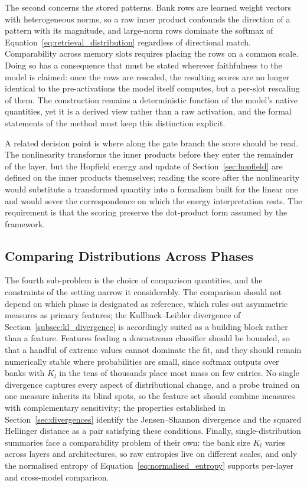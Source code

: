 The second concerns the stored patterns. Bank rows are learned weight
vectors with heterogeneous norms, so a raw inner product confounds the
direction of a pattern with its magnitude, and large-norm rows dominate the
softmax of Equation~\eqref{eq:retrieval_distribution} regardless of
directional match. Comparability across memory slots requires placing the
rows on a common scale. Doing so has a consequence that must be stated
wherever faithfulness to the model is claimed: once the rows are rescaled,
the resulting scores are no longer identical to the pre-activations the
model itself computes, but a per-slot rescaling of them. The construction
remains a deterministic function of the model's native quantities, yet it is
a derived view rather than a raw activation, and the formal statements of
the method must keep this distinction explicit.

A related decision point is where along the gate branch the score should be
read. The nonlinearity transforms the inner products before they enter the
remainder of the layer, but the Hopfield energy and update of
Section~\ref{sec:hopfield} are defined on the inner products themselves;
reading the score after the nonlinearity would substitute a transformed
quantity into a formalism built for the linear one and would sever the
correspondence on which the energy interpretation rests. The requirement is
that the scoring preserve the dot-product form assumed by the framework.

\subsection{Comparing Distributions Across Phases}
\label{subsec:pa_distribution_comparison}

The fourth sub-problem is the choice of comparison quantities, and the
constraints of the setting narrow it considerably. The comparison should not
depend on which phase is designated as reference, which rules out asymmetric
measures as primary features; the Kullback--Leibler divergence of
Section~\ref{subsec:kl_divergence} is accordingly suited as a building block
rather than a feature. Features feeding a downstream classifier should be
bounded, so that a handful of extreme values cannot dominate the fit, and
they should remain numerically stable where probabilities are small, since
softmax outputs over banks with $K_l$ in the tens of thousands place most
mass on few entries. No single divergence captures every aspect of
distributional change, and a probe trained on one measure inherits its blind
spots, so the feature set should combine measures with complementary
sensitivity; the properties established in Section~\ref{sec:divergences}
identify the Jensen--Shannon divergence and the squared Hellinger distance
as a pair satisfying these conditions. Finally, single-distribution
summaries face a comparability problem of their own: the bank size $K_l$
varies across layers and architectures, so raw entropies live on different
scales, and only the normalised entropy of
Equation~\eqref{eq:normalised_entropy} supports per-layer and cross-model
comparison.

